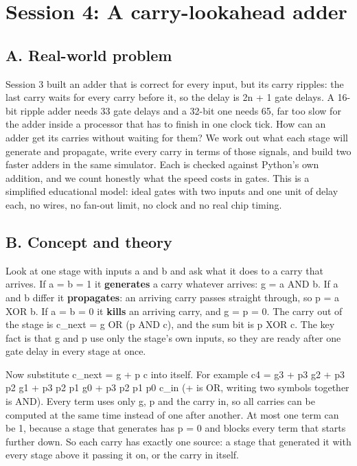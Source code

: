 \documentclass[11pt,a4paper]{article}
\begin{document}
\section{Session 4: A carry-lookahead adder}

\subsection*{A. Real-world problem}
Session 3 built an adder that is correct for every input, but its carry ripples: the last carry waits for every carry before it, so the delay is 2n + 1 gate delays. A 16-bit ripple adder needs 33 gate delays and a 32-bit one needs 65, far too slow for the adder inside a processor that has to finish in one clock tick. How can an adder get its carries without waiting for them? We work out what each stage will generate and propagate, write every carry in terms of those signals, and build two faster adders in the same simulator. Each is checked against Python's own addition, and we count honestly what the speed costs in gates. This is a simplified educational model: ideal gates with two inputs and one unit of delay each, no wires, no fan-out limit, no clock and no real chip timing.

\subsection*{B. Concept and theory}
Look at one stage with inputs a and b and ask what it does to a carry that arrives. If a = b = 1 it \textbf{generates} a carry whatever arrives: g = a AND b. If a and b differ it \textbf{propagates}: an arriving carry passes straight through, so p = a XOR b. If a = b = 0 it \textbf{kills} an arriving carry, and g = p = 0. The carry out of the stage is c\_next = g OR (p AND c), and the sum bit is p XOR c. The key fact is that g and p use only the stage's own inputs, so they are ready after one gate delay in every stage at once.

Now substitute c\_next = g + p c into itself. For example c4 = g3 + p3 g2 + p3 p2 g1 + p3 p2 p1 g0 + p3 p2 p1 p0 c\_in (+ is OR, writing two symbols together is AND). Every term uses only g, p and the carry in, so all carries can be computed at the same time instead of one after another. At most one term can be 1, because a stage that generates has p = 0 and blocks every term that starts further down. So each carry has exactly one source: a stage that generated it with every stage above it passing it on, or the carry in itself.
\end{document}
